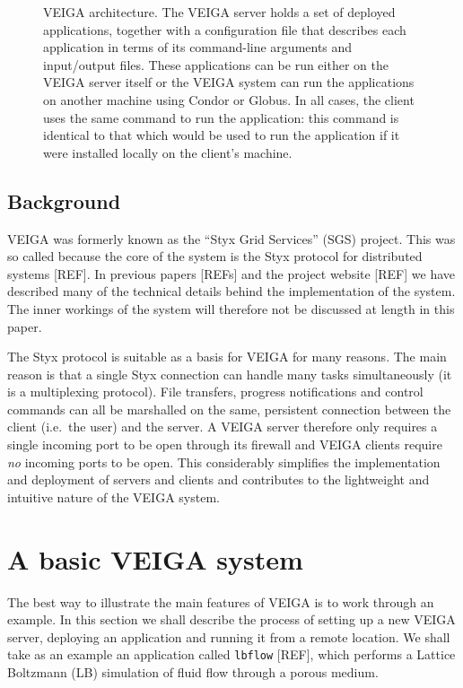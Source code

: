 \documentclass[a4paper]{article}
\begin{document}
\begin{multicols}{2}
\begin{figure}
\centering
\caption{VEIGA architecture.  The VEIGA server holds a set of deployed applications, together with a configuration file that describes each application in terms of its command-line arguments and input/output files.  These applications can be run either on the VEIGA server itself or the VEIGA system can run the applications on another machine using Condor or Globus.  In all cases, the client uses the same command to run the application: this command is identical to that which would be used to run the application if it were installed locally on the client's machine.}
\label{fig:veigaarchitecture}
\end{figure}

\subsection{Background}
VEIGA was formerly known as the ``Styx Grid Services'' (SGS) project.  This was so called because the core of the system is the Styx protocol for distributed systems [REF].  In previous papers [REFs] and the project website [REF] we have described many of the technical details behind the implementation of the system.  The inner workings of the system will therefore not be discussed at length in this paper.

The Styx protocol is suitable as a basis for VEIGA for many reasons.  The main reason is that a single Styx connection can handle many tasks simultaneously (it is a multiplexing protocol).  File transfers, progress notifications and control commands can all be marshalled on the same, persistent connection between the client (i.e.\ the user) and the server.  A VEIGA server therefore only requires a single incoming port to be open through its firewall and VEIGA clients require {\em no\/} incoming ports to be open.  This considerably simplifies the implementation and deployment of servers and clients and contributes to the lightweight and intuitive nature of the VEIGA system.


\section{A basic VEIGA system}\label{sec:basicveiga}
The best way to illustrate the main features of VEIGA is to work through an example.  In this section we shall describe the process of setting up a new VEIGA server, deploying an application and running it from a remote location.  We shall take as an example an application called {\tt lbflow} [REF], which performs a Lattice Boltzmann (LB) simulation of fluid flow through a porous medium.


\end{multicols}
\end{document}
